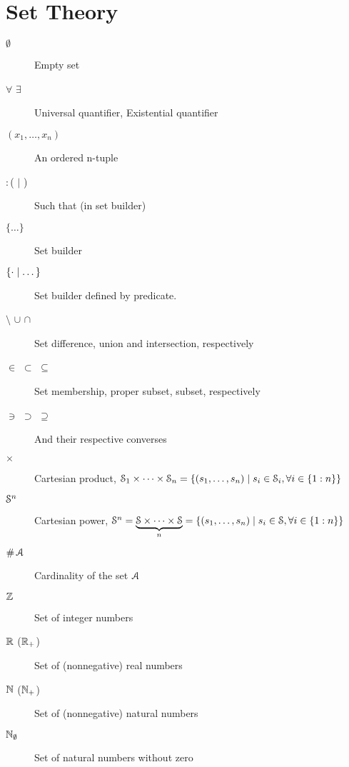 \section*{Set Theory}
\begin{description}
  \item[$\emptyset$] Empty set
  \item[$\forall$ $\exists$] Universal quantifier, Existential quantifier
  \item[$(x_{1},\dots,x_{n})$] An ordered n-tuple
  \item[$:$\quad ( $\mid$ ) ] Such that (in set builder)
  \item[$\{\dots\}$] Set builder
  \item[$\{\cdot\mid\dots\}$] Set builder defined by predicate.
  \item[$\setminus$ $\cup$ $\cap$] Set difference, union and intersection, respectively
  \item[$\in$ $\subset$ $\subseteq$] Set membership, proper subset, subset, respectively
  \item[$\ni$ $\supset$ $\supseteq$] And their respective converses
  \item[$\times$] Cartesian product, $\mathcal{S}_{1}\times\dots\times\mathcal{S}_{n}=\{(s_{1},\dots,s_{n})\mid s_{i}\in\mathcal{S}_{i},\forall i\in\{1:n\}\}$
  \item[$\mathcal{S}^{n}$] Cartesian power, $\mathcal{S}^{n}=\underbrace{\mathcal{S}\times\dots\times\mathcal{S}}_{n}=\{(s_{1},\dots,s_{n})\mid s_{i}\in\mathcal{S},\forall i\in\{1:n\}\} $

  \item[$\operatorname{\#}{\mathcal{A}}$] Cardinality of the set $\mathcal{A}$
  \item[$\mathbb{Z}$] Set of integer numbers
  \item[$\mathbb{R}$ ($\mathbb{R}_{+}$)] Set of (nonnegative) real numbers
  \item[$\mathbb{N}$ ($\mathbb{N}_{+}$)] Set of (nonnegative) natural numbers
  \item[$\mathbb{N}_{\emptyset}$] Set of natural numbers without zero

\end{description}
